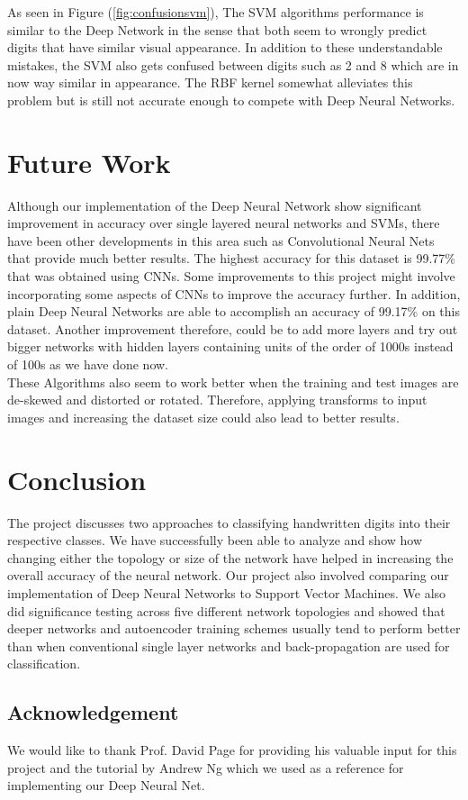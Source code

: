 \documentclass[10pt,twocolumn,letterpaper]{article}
\begin{document}
As seen in Figure (\ref{fig:confusionsvm}), The SVM algorithms performance is similar to the Deep Network in the sense that both seem to wrongly predict digits that have similar visual appearance. In addition to these understandable mistakes, the SVM also gets confused between digits such as 2 and 8 which are in now way similar in appearance. The RBF kernel somewhat alleviates this problem but is still not accurate enough to compete with Deep Neural Networks.

\section{Future Work}
Although our implementation of the Deep Neural Network show significant improvement in accuracy over single layered neural networks and SVMs, there have been other developments in this area such as Convolutional Neural Nets that provide much better results. The highest accuracy for this dataset is 99.77\% that was obtained using CNNs. Some improvements to this project might involve incorporating some aspects of CNNs to improve the accuracy further. In addition, plain Deep Neural Networks are able to accomplish an accuracy of 99.17\% on this dataset. Another improvement therefore, could be to add more layers and try out bigger networks with hidden layers containing units of the order of 1000s instead of 100s as we have done now.\\

These Algorithms also seem to work better when the training and test images are de-skewed and distorted or rotated. Therefore, applying transforms to input images and increasing the dataset size could also lead to better results.

\section{Conclusion}
The project discusses two approaches to classifying handwritten digits into their respective classes. We have successfully been able to analyze and show how changing either the topology or size of the network have helped in increasing the overall accuracy of the neural network. Our project also involved comparing our implementation of Deep Neural Networks to Support Vector Machines. We also did significance testing across five different network topologies and showed that deeper networks and autoencoder training schemes usually tend to perform better than when  conventional single layer networks and back-propagation are used for classification.
\subsection*{Acknowledgement}
We would like to thank Prof. David Page for providing his valuable input for this project and the tutorial by Andrew Ng \cite{ANg13t} which we used as a reference for implementing our Deep Neural Net.

{\small


}
\end{document}
